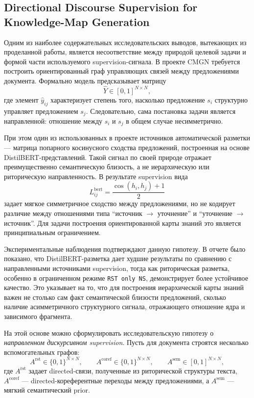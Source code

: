 \subsection{Directional Discourse Supervision for Knowledge-Map Generation}

Одним из наиболее содержательных исследовательских выводов, вытекающих из проделанной работы, является несоответствие между природой целевой задачи и формой части используемого supervision-сигнала. В проекте CMGN требуется построить ориентированный граф управляющих связей между предложениями документа. Формально модель предсказывает матрицу
\[
\hat{Y} \in [0,1]^{N \times N},
\]
где элемент $\hat{y}_{ij}$ характеризует степень того, насколько предложение $s_i$ структурно управляет предложением $s_j$. Следовательно, сама постановка задачи является направленной: отношение между $s_i$ и $s_j$ в общем случае несимметрично.

При этом один из использованных в проекте источников автоматической разметки --- матрица попарного косинусного сходства предложений, построенная на основе DistilBERT-представлений. Такой сигнал по своей природе отражает преимущественно семантическую близость, а не иерархическую или риторическую направленность. В результате supervision вида
\[
L^{\mathrm{bert}}_{ij} = \frac{\cos(h_i,h_j)+1}{2}
\]
задает мягкое симметричное сходство между предложениями, но не кодирует различие между отношениями типа ``источник $\rightarrow$ уточнение'' и ``уточнение $\rightarrow$ источник''. Для задачи построения ориентированной карты знаний это является принципиальным ограничением.

Экспериментальные наблюдения подтверждают данную гипотезу. В отчете было показано, что DistilBERT-разметка дает худшие результаты по сравнению с направленными источниками supervision, тогда как риторическая разметка, особенно в ограниченном режиме \texttt{RST only NS}, демонстрирует более устойчивое качество. Это указывает на то, что для построения иерархической карты знаний важен не столько сам факт семантической близости предложений, сколько наличие асимметричного структурного сигнала, отражающего отношение ядра и зависимого фрагмента.

На этой основе можно сформулировать исследовательскую гипотезу о \emph{направленном дискурсивном supervision}. Пусть для документа строятся несколько вспомогательных графов:
\[
A^{\mathrm{rst}} \in \{0,1\}^{N \times N}, \qquad
A^{\mathrm{coref}} \in \{0,1\}^{N \times N}, \qquad
A^{\mathrm{sem}} \in [0,1]^{N \times N},
\]
где $A^{\mathrm{rst}}$ задает directed-связи, полученные из риторической структуры текста, $A^{\mathrm{coref}}$ --- directed-кореферентные переходы между предложениями, а $A^{\mathrm{sem}}$ --- мягкий семантический prior.

